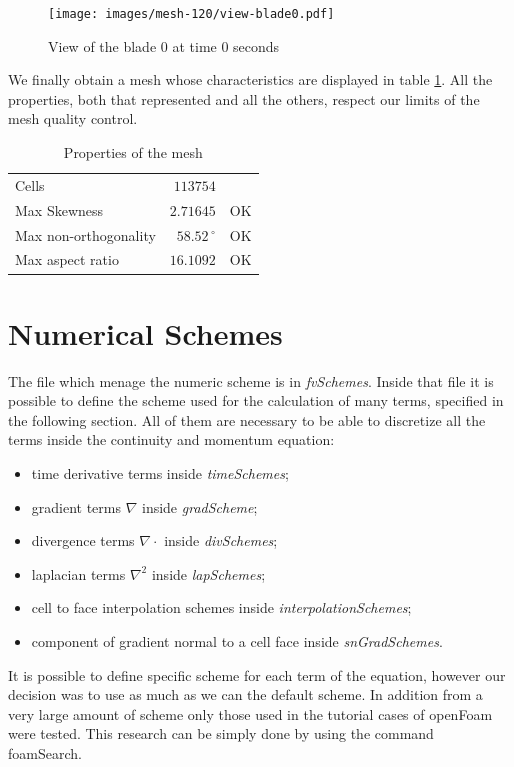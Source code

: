 \documentclass[a4paper,12pt]{article}
\newcommand{\foam}[1]{{\ttfamily #1}}
\begin{document}
\begin{figure}[H]
\centering
\texttt{[image: images/mesh-120/view-blade0.pdf]}
\caption{View of the blade 0 at time 0 seconds}
\end{figure}

We finally obtain a mesh whose characteristics are displayed in table \ref{table:mesh120}. All the properties, both that represented and all the others, respect our limits of the mesh quality control. 
\begin{table}[H]
\centering
\caption{Properties of the mesh}
\label{table:mesh120}
\begin{tabular}{lr|c}
\toprule
Cells                 & $113754$     &    \\
Max Skewness          & $2.71645$    & OK \\
Max non-orthogonality & $58.52\,^{\circ}$ & OK \\
Max aspect ratio      & $16.1092$    & OK \\ \bottomrule
\end{tabular}
\end{table} 

\section{Numerical Schemes}
The file which menage the numeric scheme is in \textit{fvSchemes}. Inside that file it is possible to define the scheme used for the calculation of many terms, specified in the following section. All of them are necessary to be able to discretize all the terms inside the continuity and momentum equation:
\begin{itemize} 
 \item time derivative terms inside \textit{timeSchemes};
 \item gradient terms $\nabla$ inside \textit{gradScheme};
 \item divergence terms $\nabla\cdot $ inside \textit{divSchemes};
 \item laplacian terms $\nabla^2$ inside \textit{lapSchemes};
 \item cell to face interpolation schemes  inside \textit{interpolationSchemes};
 \item component of gradient normal to a cell face  inside \textit{snGradSchemes}.
 \end{itemize} 
It is possible to define specific scheme for each term of the equation, however our decision was to use as much as we can the default scheme. 
In addition from a very large amount of scheme only those used in the tutorial cases of openFoam were tested. This research can be simply done by using the command \foam{foamSearch}.
\end{document}
